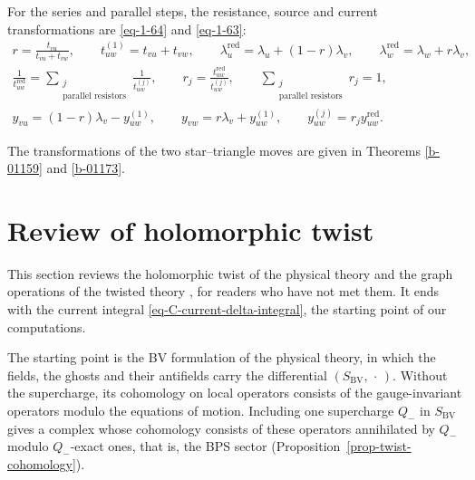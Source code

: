 \documentclass[11pt]{article}
\numberwithin{equation}{section}
\numberwithin{figure}{section}
\numberwithin{table}{section}
\begin{document}
For the series and parallel steps, the resistance, source and current transformations are \eqref{eq-1-64} and \eqref{eq-1-63}:
\begin{equation}\label{eq-sum-moves}
\begin{gathered}
r=\frac{t_{vu}}{t_{vu}+t_{vw}},\qquad t^{(1)}_{uw}=t_{vu}+t_{vw},\qquad
\lambda^{\mathrm{red}}_u=\lambda_u+(1-r)\lambda_v,\qquad
\lambda^{\mathrm{red}}_w=\lambda_w+r\lambda_v,\\
\frac1{t^{\mathrm{red}}_{uw}}=\sum_{\substack{j\\\text{parallel resistors}}}\frac1{t^{(j)}_{uw}},\qquad r_j=\frac{t^{\mathrm{red}}_{uw}}{t^{(j)}_{uw}},\qquad\sum_{\substack{j\\\text{parallel resistors}}}r_j=1,\\
y_{vu}=(1-r)\lambda_v-y^{(1)}_{uw},\qquad
y_{vw}=r\lambda_v+y^{(1)}_{uw},\qquad
y^{(j)}_{uw}=r_jy^{\mathrm{red}}_{uw}.
\end{gathered}
\end{equation}

The transformations of the two star--triangle moves are given in Theorems \ref{b-01159} and \ref{b-01173}.

\section{Review of holomorphic twist}\label{sec-BV}

This section reviews the holomorphic twist of the physical theory \cite{semichiral,BK} and the graph operations of the twisted theory \cite{Costello,Wang,operatope,higher}, for readers who have not met them. It ends with the current integral \eqref{eq-C-current-delta-integral}, the starting point of our computations.

The starting point is the BV formulation of the physical theory, in which the fields, the ghosts and their antifields carry the differential $(S_{\mathrm{BV}},\,\cdot\,)$. Without the supercharge, its cohomology on local operators consists of the gauge-invariant operators modulo the equations of motion. Including one supercharge $Q_-$ in $S_{\mathrm{BV}}$ gives a complex whose cohomology consists of these operators annihilated by $Q_-$ modulo $Q_-$-exact ones, that is, the BPS sector (Proposition~\ref{prop-twist-cohomology}).
\end{document}
